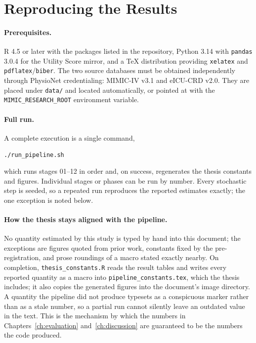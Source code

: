 \section{Reproducing the Results}
\label{app:repro}

\paragraph{Prerequisites.} R 4.5 or later with the packages listed in the
repository, Python 3.14 with \texttt{pandas} 3.0.4 for the Utility Score
mirror, and a \TeX{} distribution providing \texttt{xelatex} and
\texttt{pdflatex}/\texttt{biber}. The two source databases must be obtained
independently through PhysioNet credentialing: MIMIC-IV v3.1 and eICU-CRD
v2.0. They are placed under \texttt{data/} and located automatically, or
pointed at with the \texttt{MIMIC\_RESEARCH\_ROOT} environment variable.

\paragraph{Full run.} A complete execution is a single command,

\begin{center}\texttt{./run\_pipeline.sh}\end{center}

\noindent
which runs stages 01--12 in order and, on success, regenerates the thesis
constants and figures. Individual stages or phases can be run by number. Every
stochastic step is seeded, so a repeated run reproduces the reported estimates
exactly; the one exception is noted below.

\paragraph{How the thesis stays aligned with the pipeline.} No quantity
estimated by this study is typed by hand into this document; the exceptions are
figures quoted from prior work, constants fixed by the pre-registration, and
prose roundings of a macro stated exactly nearby. On completion,
\texttt{thesis\_constants.R}
reads the result tables and writes every reported quantity as a macro into
\texttt{pipeline\_constants.tex}, which the thesis includes; it also copies the
generated figures into the document's image directory. A quantity the pipeline
did not produce typesets as a conspicuous marker rather than as a stale number,
so a partial run cannot silently leave an outdated value in the text. This is
the mechanism by which the numbers in Chapters~\ref{ch:evaluation}
and~\ref{ch:discussion} are guaranteed to be the numbers the code produced.

